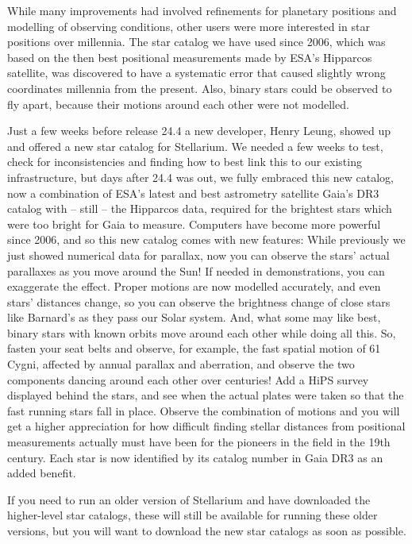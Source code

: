 While many improvements had involved  refinements for planetary positions and modelling of observing conditions, 
other users were more interested in star positions over millennia. 
The star catalog we have used since 2006, which was based on the 
then best positional measurements made by ESA's Hipparcos satellite,  was discovered to have 
a systematic error that caused slightly wrong coordinates millennia from the present. 
Also, binary stars could be observed to fly apart, because their motions around each other were not modelled. 

Just a few weeks before release 24.4 a new developer, Henry Leung, showed up and offered a new star catalog for Stellarium. 
We needed a few weeks to test, check for inconsistencies and finding how to best link this to our existing infrastructure, 
but days after 24.4 was out, we fully embraced this new catalog, now a combination of ESA's latest 
and best astrometry satellite Gaia's DR3 catalog with -- still -- the Hipparcos data, 
required for the brightest stars which were too bright for Gaia to measure. 
Computers have become more powerful since 2006, and so this new catalog comes with new features: While previously 
we just showed numerical data for parallax, now you can observe the stars' actual parallaxes as you move around the Sun! 
If needed in demonstrations, you can exaggerate the effect.
Proper motions are now modelled accurately, and even stars' distances change, so you can observe the brightness change of 
close stars like Barnard's as they pass our Solar system. And, what some may like best, 
binary stars with known orbits move around each other while doing all this. 
So, fasten your seat belts and observe, for example, the fast spatial motion of 61 Cygni, affected by annual parallax and aberration, 
and observe the two components dancing around each other over centuries! Add a HiPS survey displayed behind the stars, 
and see when the actual plates were taken so that the fast running stars fall in place. 
Observe the combination of motions and you will get a higher appreciation for how difficult 
finding stellar distances from positional measurements actually must have been for the pioneers in the field in the 19th century.
Each star is now identified by its catalog number in Gaia DR3 as an added benefit. 

If you need to run an older version of Stellarium and have downloaded the higher-level star catalogs, 
these will still be available for running these older versions, but you will want to download the new star catalogs as soon as possible. 


